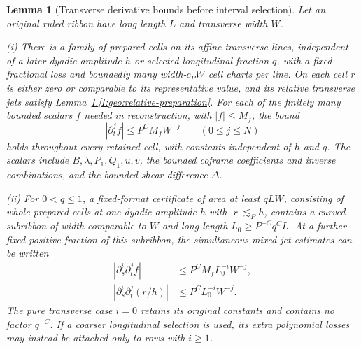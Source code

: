 \documentclass[11pt]{amsart}
\newtheorem{lemma}[theorem]{Lemma}
\theoremstyle{definition}
\theoremstyle{remark}
\numberwithin{equation}{section}
\newcommand{\partIref}[1]{\hyperref[I:#1]{I.\ref*{I:#1}}}
\begin{document}
\begin{lemma}[Transverse derivative bounds before interval selection]\label{low:5:qsa:cellwise-preparation}
Let an original ruled ribbon have long length $L$ and transverse width $W$.

\noindent\textup{(i)} There is a family of prepared cells on its affine transverse lines, independent of a later dyadic amplitude $h$ or selected longitudinal fraction $q$, with a fixed fractional loss and boundedly many width-$c_PW$ cell charts per line. On each cell $r$ is either zero or comparable to its representative value, and its relative transverse jets satisfy Lemma~\partIref{geo:relative-preparation}. For each of the finitely many bounded scalars $f$ needed in reconstruction, with $|f|\le M_f$, the bound
\[
|\partial_t^jf|\le P^CM_fW^{-j}\qquad(0\le j\le N)
\]
holds throughout every retained cell, with constants independent of $h$ and $q$. The scalars include $B,\lambda,P_1,Q_1,u,v$, the bounded coframe coefficients and inverse combinations, and the bounded shear difference $\Delta$.

\noindent\textup{(ii)} For $0<q\le1$, a fixed-format certificate of area at least $qLW$, consisting of whole prepared cells at one dyadic amplitude $h$ with $|r|\lesssim_Ph$, contains a curved subribbon of width comparable to $W$ and long length $L_0\ge P^{-C}q^CL$. At a further fixed positive fraction of this subribbon, the simultaneous mixed-jet estimates can be written
\[
\begin{aligned}
|\partial_s^i\partial_t^jf|&\le P^CM_fL_0^{-i}W^{-j},\\
|\partial_s^i\partial_t^j(r/h)|&\le P^CL_0^{-i}W^{-j}.
\end{aligned}
\]
The pure transverse case $i=0$ retains its original constants and contains no factor $q^{-C}$. If a coarser longitudinal selection is used, its extra polynomial losses may instead be attached only to rows with $i\ge1$.
\end{lemma}
\end{document}
